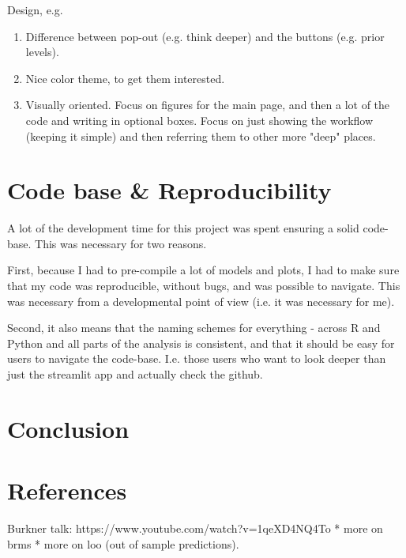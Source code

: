 \documentclass[12pt]{article}
\begin{document}
Design, e.g.
\begin{enumerate}
	\item Difference between pop-out (e.g. think deeper) and
		the buttons (e.g. prior levels). \\
	\item Nice color theme, to get them interested. \\
	\item Visually oriented. Focus on figures for the main page,
		and then a lot of the code and writing in optional boxes.
		Focus on just showing the workflow (keeping it simple) and
		then referring them to other more "deep" places. \\
\end{enumerate}

\section{Code base \& Reproducibility}

A lot of the development time for this project was spent ensuring a
solid code-base. This was necessary for two reasons.

First, because I had to pre-compile a lot of models and plots,
I had to make sure that my code was reproducible, without bugs,
and was possible to navigate. This was necessary from a developmental
point of view (i.e. it was necessary for me).

Second, it also means that the naming schemes for everything -
across R and Python and all parts of the analysis is consistent,
and that it should be easy for users to navigate the code-base.
I.e. those users who want to look deeper than just the streamlit app
and actually check the github.

\section{Conclusion}

\section{References}

Burkner talk: https://www.youtube.com/watch?v=1qeXD4NQ4To
* more on brms
* more on loo (out of sample predictions).

\printbibliography
\end{document}
